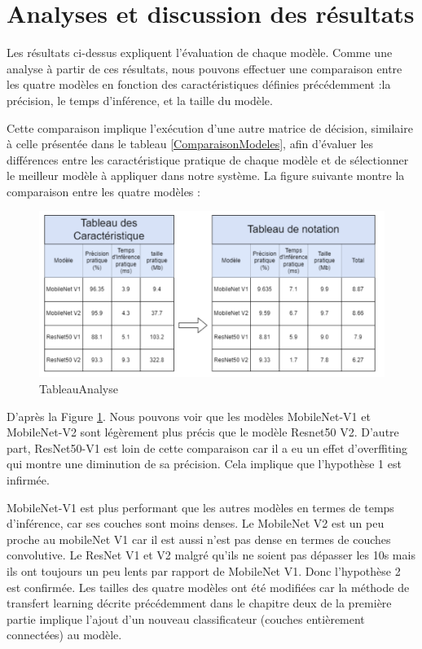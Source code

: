 \section{Analyses et discussion des résultats}
Les résultats ci-dessus expliquent l'évaluation de chaque modèle. Comme une analyse à partir de ces résultats, nous pouvons effectuer une comparaison entre les quatre modèles en fonction des caractéristiques définies précédemment :la précision, le temps d'inférence, et la taille du modèle. 

Cette comparaison implique l'exécution d'une autre matrice de décision, similaire à celle présentée dans le tableau \ref{ComparaisonModeles}, afin d'évaluer les différences entre les caractéristique pratique de chaque modèle et de sélectionner le meilleur modèle à appliquer dans notre système. La figure suivante montre la comparaison entre les quatre modèles : 
\begin{figure}[h]
    \centering
    \includegraphics[width=13cm]{assets/PartTwo/ChapterTwo/TableauAnalyse.png}
    \caption{TableauAnalyse}
    \label{TableauAnalyse}
    \end{figure} 

    D'après la Figure \ref{TableauAnalyse}. Nous pouvons voir que les modèles MobileNet-V1 et MobileNet-V2 sont légèrement plus précis que le modèle Resnet50 V2. D'autre part, ResNet50-V1 est loin de cette comparaison car il a eu un effet d'overffiting qui montre une diminution de sa précision. Cela implique que l’hypothèse 1 est infirmée. 

    MobileNet-V1 est plus performant que les autres modèles en termes de temps d'inférence, car ses couches sont moins denses. Le MobileNet V2 est un peu proche au mobileNet V1 car il est aussi n’est pas dense en termes de couches convolutive. Le ResNet V1 et V2 malgré qu’ils ne soient pas dépasser les 10s mais ils ont toujours un peu lents par rapport de MobileNet V1. Donc l’hypothèse 2 est confirmée. 
    Les tailles des quatre modèles ont été modifiées car la méthode de transfert learning décrite précédemment dans le chapitre deux de la première partie implique l'ajout d'un nouveau classificateur (couches entièrement connectées) au modèle. 
    
